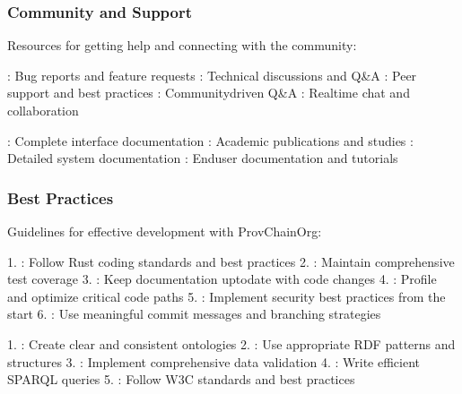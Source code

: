 \documentclass[letterpaper,10pt,english]{sphinxmanual}
\begin{document}
\subsubsection{Community and Support}
\label{\detokenize{developer/index:community-and-support}}
\sphinxAtStartPar
Resources for getting help and connecting with the community:

\sphinxAtStartPar
{}
\sphinxhyphen{} : Bug reports and feature requests
\sphinxhyphen{} : Technical discussions and Q\&A
\sphinxhyphen{} : Peer support and best practices
\sphinxhyphen{} : Community\sphinxhyphen{}driven Q\&A
\sphinxhyphen{} : Real\sphinxhyphen{}time chat and collaboration

\sphinxAtStartPar
{}
\sphinxhyphen{} : Complete interface documentation
\sphinxhyphen{} : Academic publications and studies
\sphinxhyphen{} : Detailed system documentation
\sphinxhyphen{} : End\sphinxhyphen{}user documentation and tutorials


\subsubsection{Best Practices}
\label{\detokenize{developer/index:best-practices}}
\sphinxAtStartPar
Guidelines for effective development with ProvChainOrg:

\sphinxAtStartPar
{}
1. : Follow Rust coding standards and best practices
2. : Maintain comprehensive test coverage
3. : Keep documentation up\sphinxhyphen{}to\sphinxhyphen{}date with code changes
4. : Profile and optimize critical code paths
5. : Implement security best practices from the start
6. : Use meaningful commit messages and branching strategies

\sphinxAtStartPar
{}
1. : Create clear and consistent ontologies
2. : Use appropriate RDF patterns and structures
3. : Implement comprehensive data validation
4. : Write efficient SPARQL queries
5. : Follow W3C standards and best practices
\end{document}
